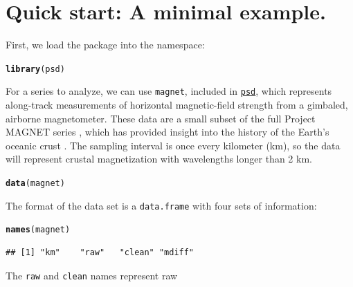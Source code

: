 \documentclass[10pt]{article}\usepackage[]{graphicx}\usepackage[]{color}
\makeatletter
\newcommand{\hlstd}[1]{\textcolor[rgb]{0.345,0.345,0.345}{#1}}%
\newcommand{\hlkwd}[1]{\textcolor[rgb]{0.737,0.353,0.396}{\textbf{#1}}}%
\newenvironment{kframe}{%
 \def\at@end@of@kframe{}%
 \ifinner\ifhmode%
  \def\at@end@of@kframe{\end{minipage}}%
  \begin{minipage}{\columnwidth}%
 \fi\fi%
 \def\FrameCommand##1{\hskip\@totalleftmargin \hskip-\fboxsep
 \colorbox{shadecolor}{##1}\hskip-\fboxsep
     \hskip-\linewidth \hskip-\@totalleftmargin \hskip\columnwidth}%
 \MakeFramed {\advance\hsize-\width
   \@totalleftmargin\z@ \linewidth\hsize
   \@setminipage}}%
 {\par\unskip\endMakeFramed%
 \at@end@of@kframe}
\newenvironment{knitrout}{}{} %
\newcommand{\Rcmd}[1]{\texttt{#1}}
\newcommand{\psd}[0]{\href{http://www.github.com/abarbour/psd/}{\color{blue}\Rcmd{psd}}}
\makeatother
\begin{document}
\section{Quick start: A minimal example.}
First, we load the package into the namespace:
\begin{knitrout}\small
{}\color{fgcolor}\begin{kframe}
\begin{alltt}
\hlkwd{library}\hlstd{(psd)}
\end{alltt}


{\ttfamily\noindent\itshape\color{messagecolor}{\#\# Loading required package: fftw\\\#\# Loaded psd (0.5.0) -- Adaptive multitaper spectrum estimation}}\end{kframe}
\end{knitrout}
For a series to analyze, we can use \Rcmd{magnet}, included in \psd{},
which represents along-track measurements
of horizontal magnetic-field strength from a gimbaled, airborne magnetometer.
These data are a small subset of the full Project MAGNET series \citep{coleman1992},
which has provided insight into
the history of the Earth's oceanic crust 
\citep{parker1997, obrien1999, korte2002}.
The sampling interval is
once every kilometer (km), so the data will represent
crustal magnetization with wavelengths longer than 2 km.
\begin{knitrout}\small
{}\color{fgcolor}\begin{kframe}
\begin{alltt}
\hlkwd{data}\hlstd{(magnet)}
\end{alltt}
\end{kframe}
\end{knitrout}
The format of the data set is a \Rcmd{data.frame} with four
sets of information:
\begin{knitrout}\small
{}\color{fgcolor}\begin{kframe}
\begin{alltt}
\hlkwd{names}\hlstd{(magnet)}
\end{alltt}
\begin{verbatim}
## [1] "km"    "raw"   "clean" "mdiff"
\end{verbatim}
\end{kframe}
\end{knitrout}
The \Rcmd{raw} and \Rcmd{clean} names represent raw
\end{document}

